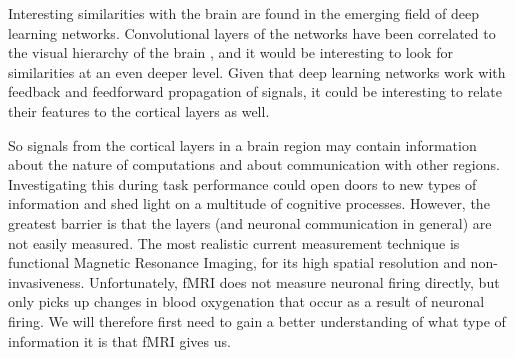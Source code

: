 Interesting similarities with the brain are found in the emerging field of deep learning networks. Convolutional layers of the networks have been correlated to the visual hierarchy of the brain \cite{Guclu2015}, and it would be interesting to look for similarities at an even deeper level. Given that deep learning networks work with feedback and feedforward propagation of signals, it could be interesting to relate their features to the cortical layers as well.

So signals from the cortical layers in a brain region may contain information about the nature of computations and about communication with other regions. Investigating this during task performance could open doors to new types of information and shed light on a multitude of cognitive processes. However, the greatest barrier is that the layers (and neuronal communication in general) are not easily measured. The most realistic current measurement technique is functional Magnetic Resonance Imaging, for its high spatial resolution and non-invasiveness. Unfortunately, fMRI does not measure neuronal firing directly, but only picks up changes in blood oxygenation that occur as a result of neuronal firing. We will therefore first need to gain a better understanding of what type of information it is that fMRI gives us.

